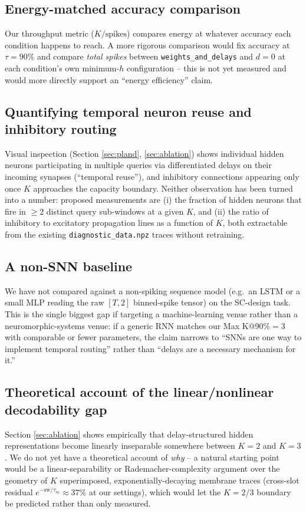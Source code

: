 \documentclass[conference]{IEEEtran}
\begin{document}
\subsection{Energy-matched accuracy comparison}
Our throughput metric ($K/\text{spikes}$) compares energy at whatever accuracy each
condition happens to reach. A more rigorous comparison would fix accuracy at $\tau{=}90\%$
and compare \emph{total spikes} between \texttt{weights\_and\_delays} and $d{=}0$ at each
condition's own minimum-$h$ configuration -- this is not yet measured and would more
directly support an ``energy efficiency'' claim.

\subsection{Quantifying temporal neuron reuse and inhibitory routing}
Visual inspection (Section \ref{sec:pland}, \ref{sec:ablation}) shows individual hidden
neurons participating in multiple queries via differentiated delays on their incoming
synapses (``temporal reuse''), and inhibitory connections appearing only once $K$
approaches the capacity boundary. Neither observation has been turned into a number:
proposed measurements are (i) the fraction of hidden neurons that fire in $\geq2$ distinct
query sub-windows at a given $K$, and (ii) the ratio of inhibitory to excitatory
propagation lines as a function of $K$, both extractable from the existing
\texttt{diagnostic\_data.npz} traces without retraining.

\subsection{A non-SNN baseline}
We have not compared against a non-spiking sequence model (e.g.\ an LSTM or a small MLP
reading the raw $[T,2]$ binned-spike tensor) on the SC-design task. This is the single
biggest gap if targeting a machine-learning venue rather than a neuromorphic-systems
venue: if a generic RNN matches our Max K@90\%$=$3 with comparable or fewer parameters,
the claim narrows to ``SNNs are one way to implement temporal routing'' rather than
``delays are a necessary mechanism for it.''

\subsection{Theoretical account of the linear/nonlinear decodability gap}
Section \ref{sec:ablation} shows empirically that delay-structured hidden representations
become linearly inseparable somewhere between $K{=}2$ and $K{=}3$. We do not yet have a
theoretical account of \emph{why} -- a natural starting point would be a
linear-separability or Rademacher-complexity argument over the geometry of $K$
superimposed, exponentially-decaying membrane traces (cross-slot residual
$e^{-\text{sw}/\tau_m}\approx37\%$ at our settings), which would let the $K{=}2/3$
boundary be predicted rather than only measured.
\end{document}
